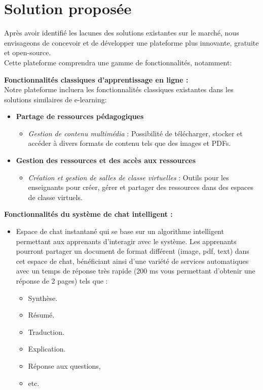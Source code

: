 \section{Solution proposée}
Après avoir identifié les lacunes des solutions existantes sur le marché, nous envisageons de concevoir et de développer une plateforme plus innovante, gratuite et open-source.\\
Cette plateforme comprendra une gamme de fonctionnalités, notamment:

\vspace{0.5em}
\noindent \textbf{Fonctionnalités classiques d'apprentissage en ligne :}\\
Notre plateforme incluera les fonctionnalités classiques existantes dans les solutions similaires de e-learning:
\begin{itemize}[itemsep=2pt, parsep=2pt]
    \item \textbf{Partage de ressources pédagogiques}
    \begin{itemize}
        \item \textit{Gestion de contenu multimédia} : Possibilité de télécharger, stocker et accéder à divers formats de contenu tels que des images et PDFs.
    \end{itemize}
    \item \textbf{Gestion des ressources et des accès aux ressources}
    \begin{itemize}
        \item \textit{Création et gestion de salles de classe virtuelles} : Outils pour les enseignants pour créer, gérer et partager des ressources dans des espaces de classe virtuels.
    \end{itemize}   
\end{itemize}
\vspace{0.5em}
\textbf{Fonctionnalités du système de chat intelligent :}\\
\begin{itemize}
    \item Espace de chat instantané qui se base sur un algorithme intelligent permettant aux apprenants d'interagir avec le système. Les apprenants pourront partager un document de format différent (image, pdf, text) dans cet espace de chat, bénéficiant ainsi d'une variété de services automatiques avec un temps de réponse très rapide (200 ms vous permettant d'obtenir une réponse de 2 pages) tels que :
    \begin{itemize}[itemsep=2pt, parsep=2pt]
        \item Synthèse.
        \item Résumé.
        \item Traduction.
        \item Explication.
        \item Réponse aux questions, 
        \item etc.
    \end{itemize}
\end{itemize}
